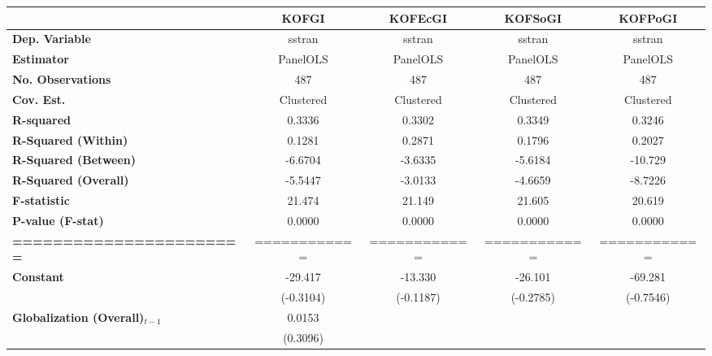 \begin{center}
\begin{tabular}{lcccc}
\toprule
                                   & \textbf{KOFGI} & \textbf{KOFEcGI} & \textbf{KOFSoGI} & \textbf{KOFPoGI}  \\
\midrule
\textbf{Dep. Variable}             &     sstran     &      sstran      &      sstran      &      sstran       \\
\textbf{Estimator}                 &    PanelOLS    &     PanelOLS     &     PanelOLS     &     PanelOLS      \\
\textbf{No. Observations}          &      487       &       487        &       487        &       487         \\
\textbf{Cov. Est.}                 &   Clustered    &    Clustered     &    Clustered     &    Clustered      \\
\textbf{R-squared}                 &     0.3336     &      0.3302      &      0.3349      &      0.3246       \\
\textbf{R-Squared (Within)}        &     0.1281     &      0.2871      &      0.1796      &      0.2027       \\
\textbf{R-Squared (Between)}       &    -6.6704     &     -3.6335      &     -5.6184      &     -10.729       \\
\textbf{R-Squared (Overall)}       &    -5.5447     &     -3.0133      &     -4.6659      &     -8.7226       \\
\textbf{F-statistic}               &     21.474     &      21.149      &      21.605      &      20.619       \\
\textbf{P-value (F-stat)}          &     0.0000     &      0.0000      &      0.0000      &      0.0000       \\
\textbf{=======================}   &  ============  &   ============   &   ============   &   ============    \\
\textbf{Constant}                     &    -29.417     &     -13.330      &     -26.101      &     -69.281       \\
\textbf{ }                         &   (-0.3104)    &    (-0.1187)     &    (-0.2785)     &    (-0.7546)      \\
\textbf{Globalization (Overall)$_{t-1}$}               &     0.0153     &                  &                  &                   \\
\textbf{ }                         &    (0.3096)    &                  &                  &                   \\

\end{tabular}
\end{center}
